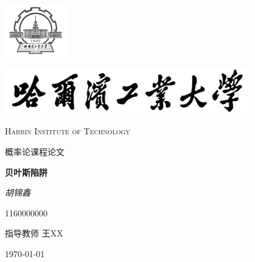 \documentclass[12pt,a4paper]{report}
\begin{document}
\begin{titlepage}
	\centering
	\includegraphics[width=0.2\textwidth]{sf1.png}\par
	\vspace{1cm}
	\includegraphics[width=0.8\textwidth]{sf.jpg}\par
	\vspace{0.1cm}
	{\scshape\LARGE Harbin Institute of Technology \par}
	\vspace{1cm}
	{\kaishu\LARGE 概率论课程论文\par}
	\vspace{1.5cm}
	{\huge\bfseries 贝叶斯陷阱\par}
	\vspace{2cm}
	{\fangsong\Large\itshape 胡锦鑫\par}
	\vfill
	{1160000000}\par

	\vfill
	指导教师	\textsc{王XX}
	\vfill
	{\large \today\par}
\end{titlepage}
\end{document}
